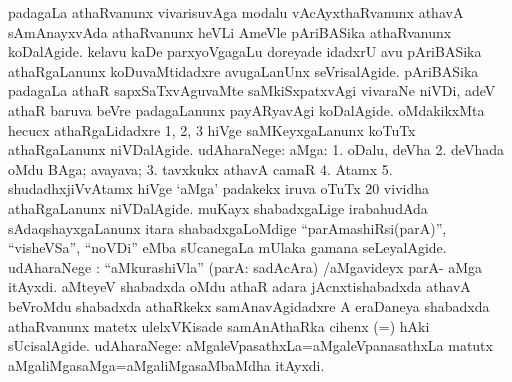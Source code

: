 padagaLa athaRvanunx vivarisuvAga modalu vAcAyxthaRvanunx athavA sAmAnayxvAda athaRvanunx heVLi AmeVle pAriBASika athaRvanunx koDalAgide. kelavu kaDe parxyoVgagaLu doreyade idadxrU avu pAriBASika athaRgaLanunx koDuvaMtidadxre avu\-gaLanUnx seVrisalAgide. pAriBASika padagaLa athaR sapxSaTxvAguvaMte saMkiSxpatxvAgi vivaraNe niVDi, adeV athaR baruva beVre padagaLanunx payARyavAgi koDalAgide. oMdakikxMta hecucx athaRgaLidadxre 1, 2, 3 hiVge saMKeyxgaLanunx koTuTx athaRgaLanunx niVDalAgide. udAharaNege: aMga: 1. oDalu, deVha 2. deVhada oMdu BAga; avayava; 3. tavxkukx athavA camaR 4. Atamx 5. shudadhxjiVvAtamx hiVge `aMga' padakekx iruva oTuTx 20 vividha athaRgaLanunx niVDalAgide. muKayx shabadxgaLige irabahudAda sAdaqshayxgaLanunx itara shabadxgaLoMdige ``parAmashiRsi(parA)'', ``visheVSa'', ``noVDi'' eMba sUcanegaLa mUlaka gamana seLeyalAgide. udAharaNege : {``aMkurashiVla'' (parA: sadAcAra) /aMgavideyx parA- aMga} itAyxdi. aMteyeV shabadxda oMdu athaR adara jAcnxtishabadxda athavA beVroMdu shabadxda athaRkekx samAnavAgidadxre A eraDaneya shabadxda athaRvanunx matetx ulelxVKisade samAnAthaRka cihenx (=) hAki sUcisalAgide. udAharaNege: aMgaleVpasathxLa=aMgaleVpanasathxLa matutx aMgaliMgasaMga=aMgaliMgasaMbaMdha itAyxdi.

\newpage

